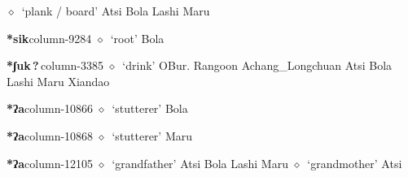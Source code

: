          $\diamond$~`plank / board'
         Atsi 
\hspace{1ex}
         Bola 
\hspace{1ex}
         Lashi 
\hspace{1ex}
         Maru 
  \item {\footnotesize \textbf{*sik}}{\tiny column-9284}
         $\diamond$~`root'
         Bola 
  \item {\footnotesize \textbf{*ʃuk\,?\,}}{\tiny column-3385}
         $\diamond$~`drink'
         OBur. 
\hspace{1ex}
         Rangoon 
\hspace{1ex}
         Achang\_Longchuan 
\hspace{1ex}
         Atsi 
\hspace{1ex}
         Bola 
\hspace{1ex}
         Lashi 
\hspace{1ex}
         Maru 
\hspace{1ex}
         Xiandao 
  \item {\footnotesize \textbf{*ʔa}}{\tiny column-10866}
         $\diamond$~`stutterer'
         Bola 
  \item {\footnotesize \textbf{*ʔa}}{\tiny column-10868}
         $\diamond$~`stutterer'
         Maru 
  \item {\footnotesize \textbf{*ʔa}}{\tiny column-12105}
         $\diamond$~`grandfather'
         Atsi 
\hspace{1ex}
         Bola 
\hspace{1ex}
         Lashi 
\hspace{1ex}
         Maru 
\hspace{1ex}
         $\diamond$~`grandmother'
         Atsi 
\hspace{1ex}
